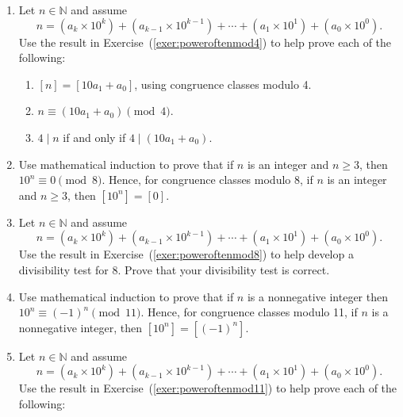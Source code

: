 \begin{enumerate}
\item Let  $n \in \mathbb{N}$ and assume  \label{exer:divtest4}
\[
n = \left( {a_k  \times 10^k } \right) + \left( {a_{k - 1}  \times 10^{k - 1} } \right) +  \cdots  + \left( {a_1  \times 10^1 } \right) + \left( {a_0  \times 10^0 } \right)\!.
\]
Use the result in Exercise~(\ref{exer:poweroftenmod4}) to help prove each of the following:
\begin{enumerate}
  \item $[ n ] = [ {10a_1  + a_0 } ]$, using congruence classes modulo 4.

  \item $n \equiv \left( {10a_1  + a_0 } \right) \pmod 4$. 

  \item $4 \mid n$  if and only if  $4 \mid \left( {10a_1  + a_0 } \right)$.
%

\end{enumerate}

\item Use mathematical induction to prove that if  $n$  is an integer and  $n \geq 3$, then  $10^n  \equiv 0 \pmod 8$.  Hence, for congruence classes modulo 8,  if  $n$  is an integer and  $n \geq 3$, then  $[ {10^n } ] = [ 0 ]$.
\label{exer:poweroftenmod8}%

\item Let  $n \in \mathbb{N}$ and assume  \label{exer:divtest8}
\[
n = \left( {a_k  \times 10^k } \right) + \left( {a_{k - 1}  \times 10^{k - 1} } \right) +  \cdots  + \left( {a_1  \times 10^1 } \right) + \left( {a_0  \times 10^0 } \right)\!.
\]
Use the result in Exercise~(\ref{exer:poweroftenmod8}) to help develop a divisibility test for  8.  Prove that your divisibility test is correct.

\item Use mathematical induction to prove that if  $n$  is a nonnegative integer  then  
$10^n  \equiv \left( -1 \right)^{n} \pmod {11}$.  Hence, for congruence classes modulo 11,  if  $n$  is a nonnegative integer, then  
$[ {10^n } ] = [ \left( -1 \right)^{n} ]$.
\label{exer:poweroftenmod11}%

\item Let  $n \in \mathbb{N}$ and assume  
\label{exer:divtest11}%
\[
n = \left( {a_k  \times 10^k } \right) + \left( {a_{k - 1}  \times 10^{k - 1} } \right) +  \cdots  + \left( {a_1  \times 10^1 } \right) + \left( {a_0  \times 10^0 } \right)\!.
\]
Use the result in Exercise~(\ref{exer:poweroftenmod11}) to help prove each of the following:


\end{enumerate}
